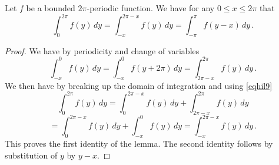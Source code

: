 \begin{lemma}\label{periodic-domain-shift}
\leanok
{}
Let $f$ be a bounded $2\pi$-periodic function. We have for any
$0 \le x\le 2\pi$ that
\begin{equation}
 \int_0^{2\pi} f(y)\, dy= \int_{-x}^{2\pi -x} f(y)\, dy
 =\int_{-\pi}^{\pi} f(y-x)\, dy\,.
\end{equation}
\end{lemma}
\begin{proof}
\leanok
    We have by periodicity and change of variables
    \begin{equation}\label{eqhil9}
 \int_{-x}^{0} f(y)\, dy=\int_{-x}^{0} f(y+2\pi)\, dy= \int_{2\pi -x}^{2\pi} f(y)\, dy\, .
\end{equation}
We then have by breaking up the domain of integration
and using \eqref{eqhil9}
\begin{equation*}
 \int_0^{2\pi} f(y)\, dy= \int_0^{2\pi -x} f(y)\, dy+
 \int_{2\pi -x}^{2\pi} f(y)\, dy
 \end{equation*}
\begin{equation}
= \int_0^{2\pi -x} f(y)\, dy+
 \int_{ -x}^{0} f(y)\, dy
 = \int_{-x}^{2\pi-x} f(y)\, dy\, .
 \end{equation}
This proves the first identity of the lemma. The second identity follows by substitution of $y$ by $y-x$.
\end{proof}



